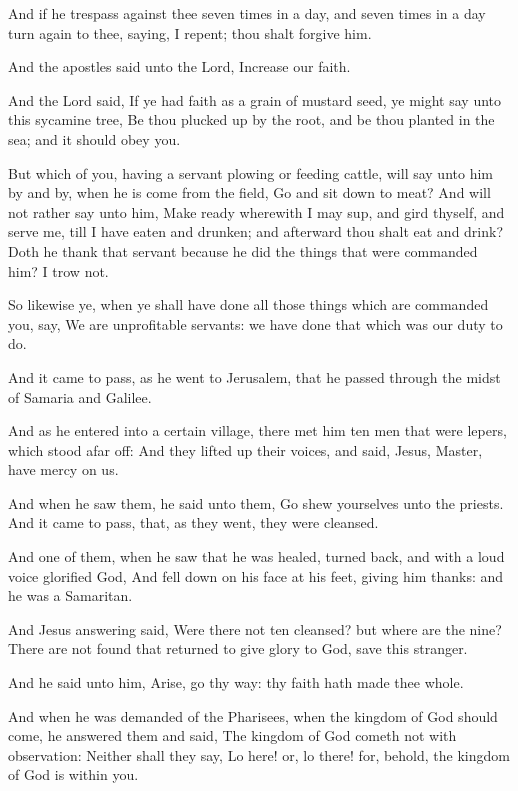 \verse And if he trespass against thee seven times in a day, and seven times in a day turn again to thee, saying, I repent; thou shalt forgive him.

\verse And the apostles said unto the Lord, Increase our faith.

\verse And the Lord said, If ye had faith as a grain of mustard seed, ye might say unto this sycamine tree, Be thou plucked up by the root, and be thou planted in the sea; and it should obey you.

\verse But which of you, having a servant plowing or feeding cattle, will say unto him by and by, when he is come from the field, Go and sit down to meat?  \verse And will not rather say unto him, Make ready wherewith I may sup, and gird thyself, and serve me, till I have eaten and drunken; and afterward thou shalt eat and drink?  \verse Doth he thank that servant because he did the things that were commanded him?  I trow not.

\verse So likewise ye, when ye shall have done all those things which are commanded you, say, We are unprofitable servants: we have done that which was our duty to do.

\verse And it came to pass, as he went to Jerusalem, that he passed through the midst of Samaria and Galilee.

\verse And as he entered into a certain village, there met him ten men that were lepers, which stood afar off: \verse And they lifted up their voices, and said, Jesus, Master, have mercy on us.

\verse And when he saw them, he said unto them, Go shew yourselves unto the priests. And it came to pass, that, as they went, they were cleansed.

\verse And one of them, when he saw that he was healed, turned back, and with a loud voice glorified God, \verse And fell down on his face at his feet, giving him thanks: and he was a Samaritan.

\verse And Jesus answering said, Were there not ten cleansed? but where are the nine?  \verse There are not found that returned to give glory to God, save this stranger.

\verse And he said unto him, Arise, go thy way: thy faith hath made thee whole.

\verse And when he was demanded of the Pharisees, when the kingdom of God should come, he answered them and said, The kingdom of God cometh not with observation: \verse Neither shall they say, Lo here! or, lo there! for, behold, the kingdom of God is within you.


